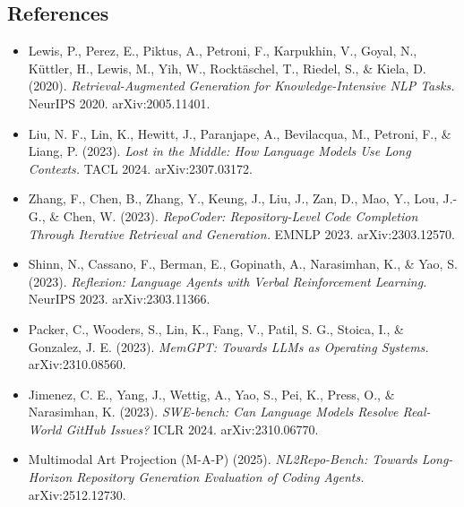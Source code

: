 \documentclass[
  10pt,
]{article}
\providecommand{\tightlist}{%
  \setlength{\itemsep}{0pt}\setlength{\parskip}{0pt}}
\begin{document}
\subsection{References}\label{references}

\begin{itemize}
\tightlist
\item
  Lewis, P., Perez, E., Piktus, A., Petroni, F., Karpukhin, V., Goyal,
  N., Küttler, H., Lewis, M., Yih, W., Rocktäschel, T., Riedel, S., \&
  Kiela, D. (2020). \emph{Retrieval-Augmented Generation for
  Knowledge-Intensive NLP Tasks.} NeurIPS 2020. arXiv:2005.11401.
\item
  Liu, N. F., Lin, K., Hewitt, J., Paranjape, A., Bevilacqua, M.,
  Petroni, F., \& Liang, P. (2023). \emph{Lost in the Middle: How
  Language Models Use Long Contexts.} TACL 2024. arXiv:2307.03172.
\item
  Zhang, F., Chen, B., Zhang, Y., Keung, J., Liu, J., Zan, D., Mao, Y.,
  Lou, J.-G., \& Chen, W. (2023). \emph{RepoCoder: Repository-Level Code
  Completion Through Iterative Retrieval and Generation.} EMNLP 2023.
  arXiv:2303.12570.
\item
  Shinn, N., Cassano, F., Berman, E., Gopinath, A., Narasimhan, K., \&
  Yao, S. (2023). \emph{Reflexion: Language Agents with Verbal
  Reinforcement Learning.} NeurIPS 2023. arXiv:2303.11366.
\item
  Packer, C., Wooders, S., Lin, K., Fang, V., Patil, S. G., Stoica, I.,
  \& Gonzalez, J. E. (2023). \emph{MemGPT: Towards LLMs as Operating
  Systems.} arXiv:2310.08560.
\item
  Jimenez, C. E., Yang, J., Wettig, A., Yao, S., Pei, K., Press, O., \&
  Narasimhan, K. (2023). \emph{SWE-bench: Can Language Models Resolve
  Real-World GitHub Issues?} ICLR 2024. arXiv:2310.06770.
\item
  Multimodal Art Projection (M-A-P) (2025). \emph{NL2Repo-Bench: Towards
  Long-Horizon Repository Generation Evaluation of Coding Agents.}
  arXiv:2512.12730.
\end{itemize}
\end{document}
